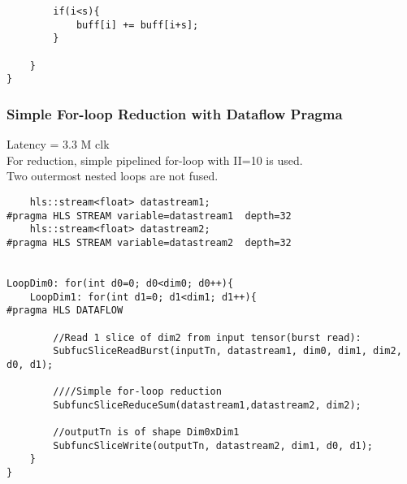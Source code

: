 \documentclass[•]{article}
\begin{document}
\begin{enumerate}
\begin{lstlisting}
		if(i<s){
			buff[i] += buff[i+s];
		}

	}
}
\end{lstlisting}

\subsubsection{Simple For-loop Reduction with Dataflow Pragma}
Latency = 3.3 M clk \\
For reduction, simple pipelined for-loop with II=10 is used.\\
Two outermost nested loops are not fused.
\begin{lstlisting}
    hls::stream<float> datastream1;
#pragma HLS STREAM variable=datastream1  depth=32
    hls::stream<float> datastream2;
#pragma HLS STREAM variable=datastream2  depth=32


LoopDim0: for(int d0=0; d0<dim0; d0++){
	LoopDim1: for(int d1=0; d1<dim1; d1++){
#pragma HLS DATAFLOW

		//Read 1 slice of dim2 from input tensor(burst read):
		SubfucSliceReadBurst(inputTn, datastream1, dim0, dim1, dim2, d0, d1);

		////Simple for-loop reduction
		SubfuncSliceReduceSum(datastream1,datastream2, dim2);

		//outputTn is of shape Dim0xDim1
		SubfuncSliceWrite(outputTn, datastream2, dim1, d0, d1);
	}
}

\end{lstlisting}

\end{enumerate}
\end{document}
